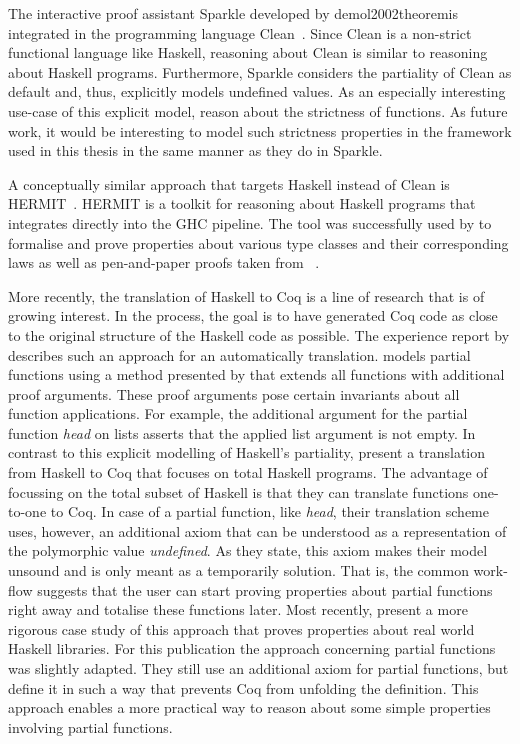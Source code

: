 The interactive proof assistant Sparkle developed by demol2002theoremis integrated in the programming language Clean~\citep{brus1987clean}.
Since Clean is a non\--strict functional language like Haskell, reasoning about Clean is similar to reasoning about Haskell programs.
Furthermore, Sparkle considers the partiality of Clean as default and, thus, explicitly models undefined values.
As an especially interesting use\--case of this explicit model, \citet{vaneekelen2006proof} reason about the strictness of functions.
As future work, it would be interesting to model such strictness properties in the framework used in this thesis in the same manner as they do in Sparkle.

A conceptually similar approach that targets Haskell instead of Clean is HERMIT~\citep{farmer2015reasoning}.
HERMIT is a toolkit for reasoning about Haskell programs that integrates directly into the GHC pipeline.
The tool was successfully used by \citeauthor{farmer2015reasoning} to formalise and prove properties about various type classes and their corresponding laws as well as pen\--and\--paper proofs taken from ~\citep{bird2010pearls}.

More recently, the translation of Haskell to Coq is a line of research that is of growing interest.
In the process, the goal is to have generated Coq code as close to the original structure of the Haskell code as possible.
The experience report by \citet{dijkstra2012experimentation} describes such an approach for an automatically translation.
\citeauthor{dijkstra2012experimentation} models partial functions using a method presented by \citet{bove2007computation} that extends all functions with additional proof arguments.
These proof arguments pose certain invariants about all function applications.
For example, the additional argument for the partial function \emph{head} on lists asserts that the applied list argument is not empty.
In contrast to this explicit modelling of Haskell's partiality, \citet{spector-zabusky2018total} present a translation from Haskell to Coq that focuses on total Haskell programs.
The advantage of focussing on the total subset of Haskell is that they can translate functions one\--to\--one to Coq.
In case of a partial function, like \emph{head}, their translation scheme uses, however, an additional axiom that can be understood as a representation of the polymorphic value \emph{undefined}.
As they state, this axiom makes their model unsound and is only meant as a temporarily solution.
That is, the common work\--flow suggests that the user can start proving properties about partial functions right away and totalise these functions later.
Most recently, \citet{breitner2018ready} present a more rigorous case study of this approach that proves properties about real world Haskell libraries.
For this publication the approach concerning partial functions was slightly adapted.
They still use an additional axiom for partial functions, but define it in such a way that prevents Coq from unfolding the definition.
This approach enables a more practical way to reason about some simple properties involving partial functions.

